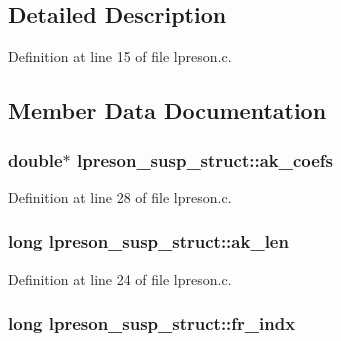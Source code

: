 \subsection{Detailed Description}


Definition at line 15 of file lpreson.\+c.



\subsection{Member Data Documentation}
\subsubsection[{\texorpdfstring{ak\+\_\+coefs}{ak_coefs}}]{\setlength{\rightskip}{0pt plus 5cm}double$\ast$ lpreson\+\_\+susp\+\_\+struct\+::ak\+\_\+coefs}\hypertarget{structlpreson__susp__struct_ac0903f4413dea4eaec92963cac02d4bf}{}\label{structlpreson__susp__struct_ac0903f4413dea4eaec92963cac02d4bf}


Definition at line 28 of file lpreson.\+c.

\subsubsection[{\texorpdfstring{ak\+\_\+len}{ak_len}}]{\setlength{\rightskip}{0pt plus 5cm}long lpreson\+\_\+susp\+\_\+struct\+::ak\+\_\+len}\hypertarget{structlpreson__susp__struct_afbaf2328ef0b29e7b01eeb91d6505eb9}{}\label{structlpreson__susp__struct_afbaf2328ef0b29e7b01eeb91d6505eb9}


Definition at line 24 of file lpreson.\+c.

\subsubsection[{\texorpdfstring{fr\+\_\+indx}{fr_indx}}]{\setlength{\rightskip}{0pt plus 5cm}long lpreson\+\_\+susp\+\_\+struct\+::fr\+\_\+indx}\hypertarget{structlpreson__susp__struct_a033be2728f4cdd98153901caf1a4bce5}{}\label{structlpreson__susp__struct_a033be2728f4cdd98153901caf1a4bce5}


